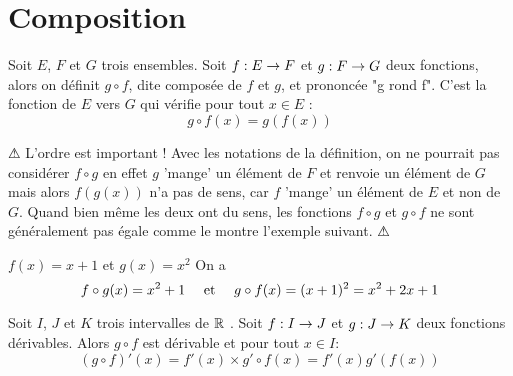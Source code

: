 \documentclass[a4paper, 11pt]{article}
\begin{document}
\section{Composition}

\begin{defi}
Soit $E$,  $F$ et $G$ trois ensembles. Soit $f : E\rightarrow F$ et $g : F \rightarrow G$ deux fonctions, alors on définit 
$g\circ f$, dite composée de  $f$ et $g$, et prononcée  "g rond f". C'est la fonction 
de $E$ vers $G$ qui vérifie pour tout $x\in E$ :
$$g\circ f (x) = g(f(x))$$
\end{defi}

$\warning$ L'ordre est important !  Avec les notations de la définition, on ne pourrait pas considérer $f\circ g$ en effet $g$ 'mange' un élément de $F$ et renvoie un élément de $G$ mais alors $f(g(x))$ n'a pas de sens, car $f$ 'mange' un élément de $E$ et non de $G$. Quand bien même les deux ont du sens, les fonctions $f\circ g$ et $g\circ f$ ne sont généralement pas égale comme le montre l'exemple suivant. 
 $\warning$
 
 \begin{exemples}
     \item $f(x)=x+1$ et $g(x)=x^2$ On a $$f\circ g(x)= x^2+1 \quad \text{ et } \quad g\circ f (x) = (x+1)^2=x^2+2x+1$$
 \end{exemples}
 
 
\begin{prop}
Soit $I$,  $J$ et $K$ trois intervalles de $\mathbb{R}$ . Soit $f : I\rightarrow J$ et $g : J \rightarrow K$ deux fonctions dérivables. Alors $ g\circ f$ est dérivable et pour tout $x\in I$:
$$(g\circ f)'(x) = f'(x) \times g'\circ f (x) = f'(x)  g'(f (x) )$$
\end{prop} 
 
\end{document}
